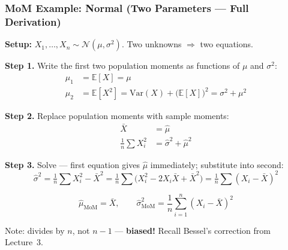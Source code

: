 \documentclass[aspectratio=169]{beamer}
\begin{document}
\begin{frame}
\frametitle{MoM Example: Normal (Two Parameters --- Full Derivation)}

\small
\textbf{Setup:} $X_1, \ldots, X_n \sim \mathcal{N}(\mu, \sigma^2)$. \;Two unknowns $\Rightarrow$ two equations.

\vspace{0.15cm}
\textbf{Step 1.} Write the first two population moments as functions of $\mu$ and $\sigma^2$:
\vspace{-0.1cm}
\begin{align*}
  \mu_1 &= \mathbb{E}[X] = \mu \\[-2pt]
  \mu_2 &= \mathbb{E}[X^2] = \text{Var}(X) + \bigl(\mathbb{E}[X]\bigr)^2 = \sigma^2 + \mu^2
\end{align*}

\vspace{-0.35cm}\pause
\textbf{Step 2.} Replace population moments with sample moments:
\vspace{-0.1cm}
\begin{align*}
  \bar{X} &= \hat\mu \\[-2pt]
  \tfrac{1}{n}\textstyle\sum X_i^2 &= \hat\sigma^2 + \hat\mu^2
\end{align*}

\vspace{-0.35cm}\pause
\textbf{Step 3.} Solve --- first equation gives $\hat\mu$ immediately; substitute into second:
\vspace{-0.1cm}
$$\hat\sigma^2 = \tfrac{1}{n}\textstyle\sum X_i^2 - \bar{X}^2 = \tfrac{1}{n}\textstyle\sum\bigl(X_i^2 - 2X_i\bar{X} + \bar{X}^2\bigr) = \tfrac{1}{n}\textstyle\sum(X_i - \bar{X})^2$$

\vspace{-0.1cm}
$$\boxed{\hat\mu_{\text{MoM}} = \bar{X}, \qquad \hat\sigma^2_{\text{MoM}} = \frac{1}{n}\sum_{i=1}^n(X_i - \bar{X})^2}$$

\vspace{0.05cm}
\centering\footnotesize Note: divides by $n$, not $n{-}1$ --- \textbf{biased!} Recall Bessel's correction from Lecture~3.
\end{frame}
\end{document}
